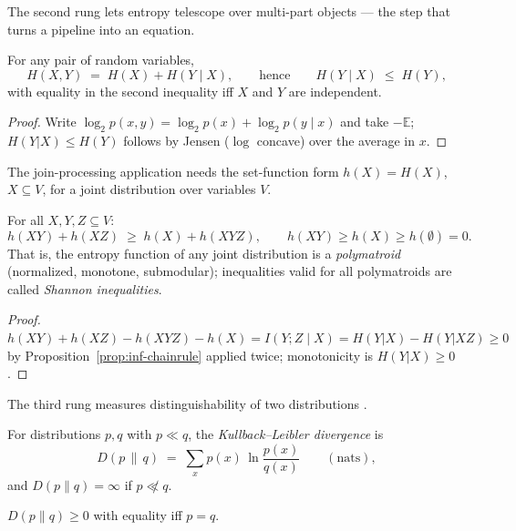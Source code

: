 The second rung lets entropy telescope over multi-part objects --- the step that turns
a pipeline into an equation.

\begin{proposition}\label{prop:inf-chainrule}
For any pair of random variables,
\[
H(X,Y) \;=\; H(X) + H(Y \mid X),
\qquad\text{hence}\qquad
H(Y \mid X) \;\le\; H(Y),
\]
with equality in the second inequality iff $X$ and $Y$ are independent. \eop
\end{proposition}

\begin{proof}
Write $\log_2 p(x,y) = \log_2 p(x) + \log_2 p(y \mid x)$ and take $-\mathbb{E}$;
$H(Y|X) \le H(Y)$ follows by Jensen ($\log$ concave) over the average in $x$.
\end{proof}

The join-processing application needs the set-function form $h(X) = H(X)$, $X \subseteq
V$, for a joint distribution over variables $V$.

\begin{corollary}\label{cor:inf-submodular}
For all $X, Y, Z \subseteq V$:
\[
h(XY) + h(XZ) \;\ge\; h(X) + h(XYZ), \qquad h(XY) \ge h(X) \ge h(\emptyset) = 0.
\]
That is, the entropy function of any joint distribution is a \emph{polymatroid}
(normalized, monotone, submodular); inequalities valid for all polymatroids are called
\emph{Shannon inequalities}. \eop
\end{corollary}

\begin{proof}
$h(XY) + h(XZ) - h(XYZ) - h(X) = I(Y;Z \mid X) = H(Y|X) - H(Y|XZ) \ge 0$ by
Proposition~\ref{prop:inf-chainrule} applied twice; monotonicity is $H(Y|X) \ge 0$.
\end{proof}

The third rung measures distinguishability of two distributions
\citep{information-theory-bg2, information-theory-bg3}.

\begin{definition}[KL divergence]\label{def:inf-kl}
For distributions $p, q$ with $p \ll q$, the \emph{Kullback--Leibler divergence} is
\[
D(p \,\|\, q) \;=\; \sum_x p(x)\,\ln\frac{p(x)}{q(x)} \qquad (\text{nats}),
\]
and $D(p\|q) = \infty$ if $p \not\ll q$.
\end{definition}

\begin{lemma}[Gibbs]\label{lem:inf-gibbs}
$D(p\|q) \ge 0$ with equality iff $p = q$. \eop
\end{lemma}

